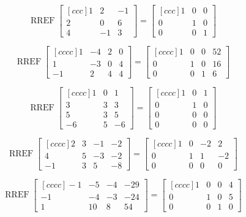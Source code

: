 \documentclass{article}
\DeclareMathOperator{\RREF}{RREF}
\begin{document}

\[\RREF 
\begin{bmatrix}[ccc]
1 & 2 & -1 \\
2 & 0 & 6  \\
4 & -1 & 3
\end{bmatrix} =
\begin{bmatrix}[ccc]
1 & 0 & 0 \\
0 & 1 & 0  \\
0 & 0 & 1
\end{bmatrix}
\]


\[ \RREF
\begin{bmatrix}[cccc]
1 & -4 & 2 & 0 \\
1 & -3 & 0 & 4 \\
-1 & 2 & 4 & 4
\end{bmatrix}=
\begin{bmatrix}[cccc]
1 & 0 & 0 & 52 \\
0 & 1 & 0 & 16 \\
0 & 0 & 1 & 6
\end{bmatrix}
\]

\[ \RREF
\begin{bmatrix}[cccc]
1 & 0 & 1  \\
3 & 3 & 3 \\
5 & 3 &5 \\
-6 & 5 & -6
\end{bmatrix}=
\begin{bmatrix}[cccc]
1 & 0 & 1  \\
0 & 1 & 0 \\
0 & 0 &0 \\
0 & 0 & 0
\end{bmatrix} 
\]

\[ \RREF \begin{bmatrix}[cccc]
2 & 3 & -1 & -2 \\
4 & 5 & -3 & -2 \\
-1 & 3 &5 & -8
\end{bmatrix}=
\begin{bmatrix}[cccc]
1 & 0 & -2 & 2 \\
0 & 1& 1  & -2 \\
0 & 0 & 0 & 0
\end{bmatrix}
\]

\[ \RREF \begin{bmatrix}[cccc]
-1 & -5 & -4 & -29 \\
-1 & -4 & -3 & -24 \\
1 & 10 & 8 & 54
\end{bmatrix} =
\begin{bmatrix}[cccc]
1 & 0 & 0 & 4 \\
0 & 1 & 0 & 5 \\
0 & 0 & 1 & 0
\end{bmatrix}
\]
\end{document}
